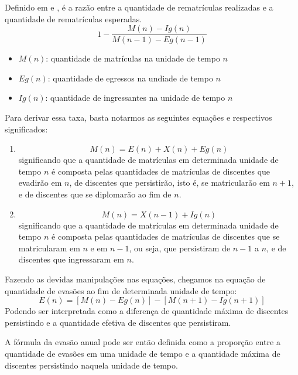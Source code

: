
Definido em \cite{esclarecimentos_calculos} e \cite{mudanca_calculos}, é a razão entre a quantidade de rematrículas realizadas e a quantidade de rematrículas esperadas.
\begin{equation}
1 - \frac{M(n) - Ig(n)}{M(n-1) - Eg(n-1)}
\end{equation}
\begin{itemize}
\item $M(n)$: quantidade de matrículas na unidade de tempo $n$
\item $Eg(n)$: quantidade de egressos na undiade de tempo $n$
\item $Ig(n)$: quantidade de ingressantes na unidade de tempo $n$
\end{itemize}

Para derivar essa taxa, basta notarmos as seguintes equações e respectivos significados:
\begin{enumerate}
\item 
\begin{equation}
M(n) = E(n) + X(n) + Eg(n)
\end{equation}
significando que a quantidade de matrículas em determinada unidade de tempo $n$ é composta pelas quantidades de matrículas de discentes que evadirão em $n$, de discentes que persistirão, isto é, se matricularão em $n+1$, e de discentes que se diplomarão ao fim de $n$.
\item 
\begin{equation}
M(n) = X(n-1) + Ig(n)
\end{equation}
significando que a quantidade de matrículas em determinada unidade de tempo $n$ é composta pelas quantidades de matrículas de discentes que se matricularam em $n$ e em $n-1$, ou seja, que persistiram de $n-1$ a $n$, e de discentes que ingressaram em $n$.
\end{enumerate}

Fazendo as devidas manipulações nas equações, chegamos na equação de quantidade de evasões ao fim de determinada unidade de tempo:
\begin{equation}
E(n) = [M(n) - Eg(n)] - [M(n+1) - Ig(n+1)]
\end{equation}
Podendo ser interpretada como a diferença de quantidade máxima de discentes persistindo e a quantidade efetiva de discentes que persistiram.

A fórmula da evasão anual pode ser então definida como a proporção entre a quantidade de evasões em uma unidade de tempo e a quantidade máxima de discentes persistindo naquela unidade de tempo.

